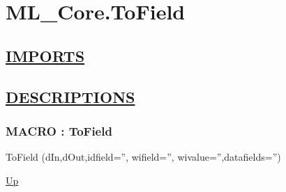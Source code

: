 \chapter*{ML\_Core.ToField}
\hypertarget{ecldoc:toc:ML_Core.ToField}{}

\section*{\underline{IMPORTS}}

\section*{\underline{DESCRIPTIONS}}
\subsection*{MACRO : ToField}
\hypertarget{ecldoc:ml_core.tofield}{}
\begin{minipage}[t]{\textwidth}
\begin{flushleft}
 ToField (dIn,dOut,idfield='', wifield='', wivalue='',datafields='')
\end{flushleft}
\end{minipage}
\hyperlink{ecldoc:toc:ML_Core}{Up}

\par
\par
